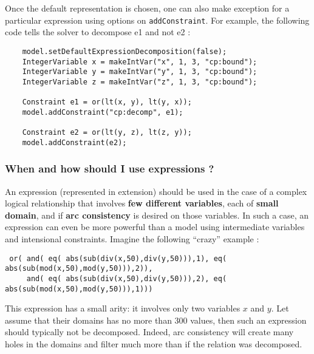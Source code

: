 Once the default representation is chosen, one can also make exception for a particular expression using options on \texttt{addConstraint}. 
For example, the following code tells the solver to decompose e1 and not e2 :
\begin{lstlisting}
	model.setDefaultExpressionDecomposition(false);
	IntegerVariable x = makeIntVar("x", 1, 3, "cp:bound");
	IntegerVariable y = makeIntVar("y", 1, 3, "cp:bound");
	IntegerVariable z = makeIntVar("z", 1, 3, "cp:bound");

	Constraint e1 = or(lt(x, y), lt(y, x));
	model.addConstraint("cp:decomp", e1);
	
	Constraint e2 = or(lt(y, z), lt(z, y));
	model.addConstraint(e2);
\end{lstlisting}

\subsubsection{When and how should I use expressions ?}\label{model:whenshouldiuseexpressions}\hypertarget{model:whenshouldiuseexpressions}{}
An expression (represented in extension) should be used in the case of a complex logical relationship that involves \textbf{few different variables}, each of \textbf{small domain}, and if \textbf{arc consistency} is desired on those variables.
In such a case, an expression can even be more powerful than a model using intermediate variables and intensional constraints.
Imagine the following ``crazy'' example :
\begin{lstlisting}
 or( and( eq( abs(sub(div(x,50),div(y,50))),1), eq( abs(sub(mod(x,50),mod(y,50))),2)),
     and( eq( abs(sub(div(x,50),div(y,50))),2), eq( abs(sub(mod(x,50),mod(y,50))),1)))
\end{lstlisting}
This expression has a small arity: it involves only two variables $x$ and $y$.
Let assume that their domains has no more than 300 values, then such an expression should typically not be decomposed. Indeed, arc consistency will create many holes in the domains and filter much more than if the relation was decomposed.

